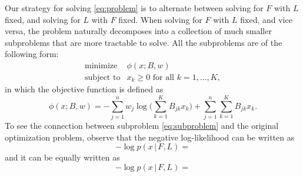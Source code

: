 \documentclass[final]{siamart171218}
\begin{document}
Our strategy for solving \eqref{eq:problem} is to alternate between
solving for $F$ with $L$ fixed, and solving for $L$ with $F$
fixed. When solving for $F$ with $L$ fixed, and vice versa, the
problem naturally decomposes into a collection of much smaller
subproblems that are more tractable to solve. All the subproblems are
of the following form:
\begin{equation}
\begin{array}{ll}
\mbox{minimize} & \phi(x; B, w) \\
\mbox{subject to} & \mbox{$x_k \geq 0$ for all $k = 1, \ldots, K$},
\end{array}
\label{eq:subproblem}
\end{equation}
in which the objective function is defined as
\begin{equation}
\phi(x; B, w) =
    - \sum_{j=1}^n w_j \log\big({\textstyle \sum_{k=1}^K B_{jk} x_k}\big)
    + \sum_{j=1}^n \sum_{k=1}^K B_{jk} x_k.
\label{eq:subproblem-objective}
\end{equation}
To see the connection between subproblem \eqref{eq:subproblem} and the
original optimization problem, observe that the negative
log-likelihood can be written as
\begin{equation}
-\log p(x \,|\, F, L) =
\end{equation}
and it can be equally written as
\begin{equation}
-\log p(x \,|\, F, L) =
\end{equation}



\end{document}
